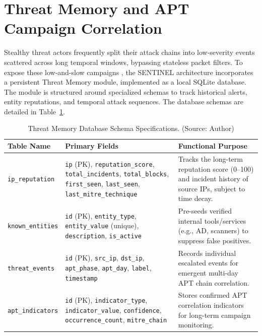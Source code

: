 \section{Threat Memory and APT Campaign Correlation}

Stealthy threat actors frequently split their attack chains into low-severity events scattered across long temporal windows, bypassing stateless packet filters. To expose these low-and-slow campaigns \cite{apt_stealth2021}, the SENTINEL architecture incorporates a persistent Threat Memory module, implemented as a local SQLite database. The module is structured around specialized schemas to track historical alerts, entity reputations, and temporal attack sequences. The database schemas are detailed in Table~\ref{tab:threat_memory_schema}.

\begin{table}[!htbp]
    \centering
    \caption{Threat Memory Database Schema Specifications. (Source: Author)}
    \label{tab:threat_memory_schema}
    \begin{tabular}{|>{\raggedright\arraybackslash}p{}|>{\raggedright\arraybackslash}p{}|>{\raggedright\arraybackslash}p{}|}
        \hline
        \textbf{Table Name} & \textbf{Primary Fields} & \textbf{Functional Purpose} \\
        \hline
        \texttt{ip\_reputation} & \texttt{ip} (PK), \texttt{reputation\_score}, \texttt{total\_incidents}, \texttt{total\_blocks}, \texttt{first\_seen}, \texttt{last\_seen}, \texttt{last\_mitre\_technique} & Tracks the long-term reputation score (0--100) and incident history of source IPs, subject to time decay. \\
        \hline
        \texttt{known\_entities} & \texttt{id} (PK), \texttt{entity\_type}, \texttt{entity\_value} (unique), \texttt{description}, \texttt{is\_active} & Pre-seeds verified internal tools/services (e.g., AD, scanners) to suppress false positives. \\
        \hline
        \texttt{threat\_events} & \texttt{id} (PK), \texttt{src\_ip}, \texttt{dst\_ip}, \texttt{apt\_phase}, \texttt{apt\_day}, \texttt{label}, \texttt{timestamp} & Records individual escalated events for emergent multi-day APT chain correlation. \\
        \hline
        \texttt{apt\_indicators} & \texttt{id} (PK), \texttt{indicator\_type}, \texttt{indicator\_value}, \texttt{confidence}, \texttt{occurrence\_count}, \texttt{mitre\_chain} & Stores confirmed APT correlation indicators for long-term campaign monitoring. \\
        \hline
    \end{tabular}
\end{table}


